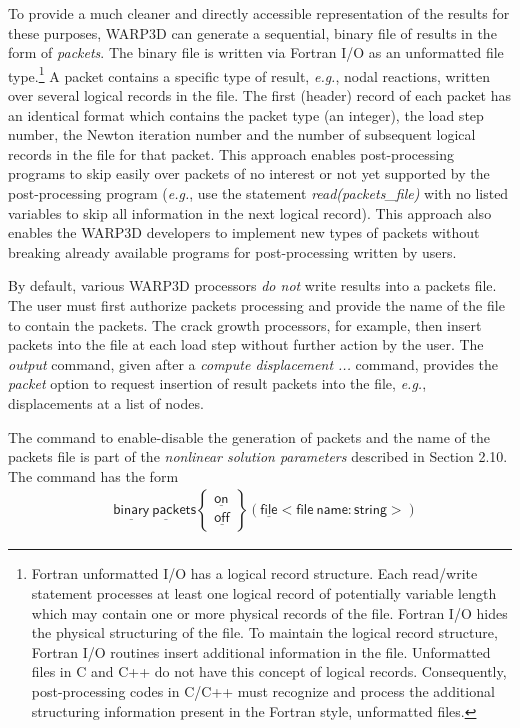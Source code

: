 \documentclass[11pt]{report}
\numberwithin{equation}{section}
\newcommand{\ul} {\underline}
\newcommand{\hv} {\mathsf}   %
\newcommand{\eg}{\emph{e.g.},\xspace}
\newcommand{\ti}{\emph}
\begin{document}
To provide a much cleaner and directly accessible representation 
of the results for these purposes, WARP3D
can generate a sequential, binary file of results in
the form of \ti{packets}. The binary file is written via Fortran I/O as an 
unformatted file type.\footnote{Fortran unformatted I/O has a logical record 
structure. Each read/write statement processes at least one logical record
of potentially variable length which may contain one or more physical records of the file. Fortran I/O
hides the physical structuring of the file. To maintain the logical record structure,
Fortran I/O routines insert additional information in the file. Unformatted files in 
C and C++ do not have this concept of logical records. Consequently, post-processing 
codes in C/C++ must recognize and process the additional structuring information 
present in the Fortran style, unformatted files. }
A packet contains a specific type of result, \eg nodal
reactions, written over several logical records in the file. The first (header) record
of each packet has an identical format which contains the packet type (an
integer), the load step number, the Newton iteration number and the 
number of subsequent
logical records in the file for that packet. This approach enables
post-processing programs to skip easily over packets of no interest or not yet
supported by the post-processing program (\eg use the 
statement \ti{read(packets\_file)} with no listed variables to skip all information in the next logical 
record).  This approach also enables the WARP3D
developers to implement new types of packets without breaking 
already available programs for post-processing written by users.

By default, various WARP3D processors \ti{do not} write results into a packets file. The user
must first authorize packets processing and provide the name of the file to
contain the packets. The crack growth processors, for example, then insert
packets into the file at each load step without further action by the user. The \ti{output} command,
given after a \ti{compute displacement ...} command, 
provides the \ti{packet} option to request insertion of
result packets into the file, \eg displacements at a list of nodes.

The command to enable-disable the generation of packets and the name of the
packets file is part of the \ti{nonlinear solution parameters} described in Section
2.10. The command has the form
\begin{align*}
& \hv{\ul{binary}\ \ul{pack}ets }
\begin{Bmatrix}
\hv{\ul{on}} \\ \hv{\ul{off}}
\end{Bmatrix}
\hv{(\ul{file} <file\ name:string>)}
\end{align*}
\end{document}
